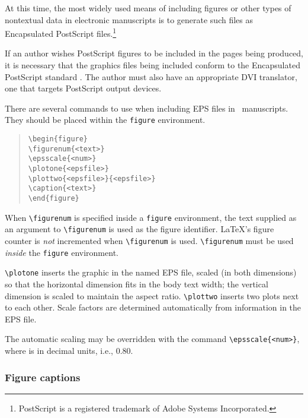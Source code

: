 \documentclass[preprint2]{aastex}
\begin{document}
At this time, the most widely used means of including figures or other 
types of nontextual data in electronic manuscripts is to generate such 
files as Encapsulated PostScript files.\footnote{%
 PostScript is a registered trademark of Adobe Systems Incorporated.%
}%
 
If an author wishes PostScript figures to be included in the 
pages being produced, it is necessary that 
the graphics files being included conform 
to the Encapsulated PostScript standard \citep{PLRM}. The 
author must also have an appropriate DVI translator, 
one that targets PostScript output devices. 
 
There are several commands to use when including EPS files 
in \aastex\ manuscripts. They should be placed within  the 
 \texttt{figure} environment. 
\begin{quote} 
\begin{verbatim} 
\begin{figure} 
\figurenum{<text>} 
\epsscale{<num>} 
\plotone{<epsfile>} 
\plottwo{<epsfile>}{<epsfile>} 
\caption{<text>} 
\end{figure} 
\end{verbatim} 
\end{quote} 
When \verb"\figurenum" is specified inside a {\tt figure} environment, 
the text supplied as an argument to \verb"\figurenum" is used as the 
figure identifier. 
\LaTeX's figure counter is \emph{not} incremented when \verb"\figurenum" 
is used. 
\verb"\figurenum" must be used \emph{inside} the {\tt figure} environment. 
 
\verb"\plotone" inserts the graphic in the named EPS file, 
scaled (in both dimensions) so that the horizontal 
dimension fits in the body text width; 
the vertical dimension is scaled to maintain the aspect ratio. 
\verb"\plottwo" inserts two plots next to each other. 
Scale factors are determined automatically from information in the 
EPS file. 
 
The automatic scaling may be overridden with the command 
\verb"\epsscale{<num>}", where  
is in decimal units, i.e., 0.80. 
 
 
\subsubsection{Figure captions} \label{legends} 
 
\end{document}
